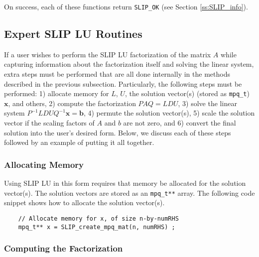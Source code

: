 \documentclass[12pt]{article}
\theoremstyle{definition}
\begin{document}
On success, each of these functions return \verb|SLIP_OK| (see Section
\ref{ss:SLIP_info}).

\cprotect\subsection{Expert SLIP LU Routines}
\label{s:Using:expert}

If a user wishes to perform the SLIP LU factorization of the matrix $A$ while
capturing information about the factorization itself and solving the linear
system, extra steps must be performed that are all done internally in the
methods described in the previous subsection. Particularly, the following steps
must be performed: 1) allocate memory for $L$, $U$, the solution vector(s)
(stored as \verb|mpq_t|) $\mathbf{x}$, and others, 2) compute the factorization
$PAQ = L D U$, 3) solve the linear system $P^{-1} L D U Q^{-1} \mathbf{x} =
\mathbf{b}$, 4) permute the solution vector(s), 5) scale the solution vector if
the scaling factors of $A$ and $b$ are not zero, and 6) convert the final
solution into the user's desired form. Below, we discuss each of these steps
followed by an example of putting it all together.

\subsubsection{Allocating Memory}

Using SLIP LU in this form requires that memory be allocated for the solution
vector(s). The solution vectors are stored as an \verb|mpq_t**| array.  The
following code snippet shows how to allocate the solution vector(s).

{\small
\begin{verbatim}
    // Allocate memory for x, of size n-by-numRHS
    mpq_t** x = SLIP_create_mpq_mat(n, numRHS) ; \end{verbatim} }

\subsubsection{Computing the Factorization}
\end{document}
